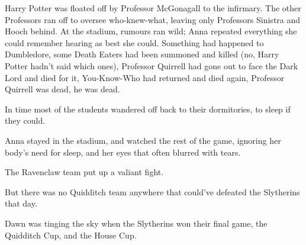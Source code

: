Harry Potter was floated off by Professor McGonagall to the infirmary. The
other Professors ran off to oversee who-knew-what, leaving only Professors
Sinistra and Hooch behind. At the stadium, rumours ran wild; Anna repeated
everything she could remember hearing as best she could. Something had happened
to Dumbledore, some Death Eaters had been summoned and killed (no, Harry Potter
hadn’t said which ones), Professor Quirrell had gone out to face the Dark Lord
and died for it, You-Know-Who had returned and died again, Professor Quirrell
was dead, he was dead.

In time most of the students wandered off back to their dormitories, to sleep
if they could.

Anna stayed in the stadium, and watched the rest of the game, ignoring her
body’s need for sleep, and her eyes that often blurred with tears.

The Ravenclaw team put up a valiant fight.

But there was no Quidditch team anywhere that could’ve defeated the Slytherins
that day.

Dawn was tinging the sky when the Slytherins won their final game, the
Quidditch Cup, and the House Cup.
